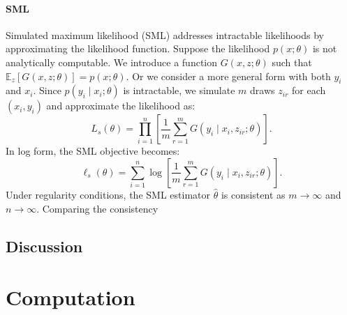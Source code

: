 \documentclass[12pt]{article}
\begin{document}
\paragraph{SML}
Simulated maximum likelihood (SML) addresses intractable likelihoods by
approximating the likelihood function. Suppose the likelihood \(p(x; \theta)\)
is not analytically computable. We introduce a function \(G(x, z; \theta)\)
such that \(\mathbb{E}_z[G(x, z; \theta)] = p(x; \theta)\). Or we consider a
more general form with both $y_i$ and $x_i$. Since \(p(y_i \mid x_i; \theta)\)
is intractable, we simulate \(m\) draws \(z_{ir}\) for each \((x_i, y_i)\) and
approximate the likelihood as:
\begin{equation*}
    L_s(\theta) = \prod_{i=1}^n \left[\frac{1}{m} \sum_{r=1}^m G(y_i \mid x_i, z_{ir}; \theta)\right].
\end{equation*}
In log form, the SML objective becomes:
\begin{equation*}
    \ell_s(\theta) = \sum_{i=1}^n \log \left[\frac{1}{m} \sum_{r=1}^m G(y_i \mid x_i, z_{ir}; \theta)\right].
\end{equation*}
Under regularity conditions, the SML estimator \(\hat{\theta}\) is consistent as \(m \to \infty\) and \(n \to \infty\). Comparing the consistency

\subsection{Discussion} \label{subsec:discussion}


\section{Computation} \label{sec:computation}
\pagebreak
\newpage

\end{document}
